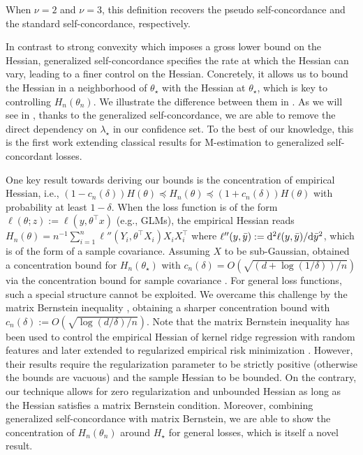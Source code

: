 When $\nu = 2$ and $\nu = 3$, this definition recovers the pseudo self-concordance and the standard self-concordance, respectively.

In contrast to strong convexity which imposes a gross lower bound on the Hessian, generalized self-concordance specifies the rate at which the Hessian can vary, leading to a finer control on the Hessian.
Concretely, it allows us to bound the Hessian in a neighborhood of $\theta_\star$ with the Hessian at $\theta_\star$, which is key to controlling $H_n(\theta_n)$.
We illustrate the difference between them in .
As we will see in , thanks to the generalized self-concordance, we are able to remove the direct dependency on $\lambda_\star$ in our confidence set.
To the best of our knowledge, this is the first work extending classical results for M-estimation to generalized self-concordant losses.

One key result towards deriving our bounds is the concentration of empirical Hessian, i.e., $(1 - c_n(\delta))H(\theta) \preceq H_n(\theta) \preceq (1 + c_n(\delta)) H(\theta)$ with probability at least $1 - \delta$.
When the loss function is of the form $\ell(\theta; z) := \ell(y, \theta^\top x)$ (e.g., GLMs), the empirical Hessian reads $H_n(\theta) = n^{-1} \sum_{i=1}^n \ell''(Y_i, \theta^\top X_i) X_i X_i^\top$ where $\ell''(y, \bar y) := \mathrm{d}^2 \ell(y, \bar y) / \mathrm{d} \bar y^2$, which is of the form of a sample covariance.
Assuming $X$ to be sub-Gaussian, \citet{ostrovskii2021finite} obtained a concentration bound for $H_n(\theta_\star)$ with $c_n(\delta) = O(\sqrt{(d + \log{(1/\delta)})/n})$ via the concentration bound for sample covariance \citep[Thm.~5.39]{vershynin2010introduction}.
For general loss functions, such a special structure cannot be exploited.
We overcame this challenge by the matrix Bernstein inequality \citep[Thm.~6.17]{wainwright2019high}, obtaining a sharper concentration bound with $c_n(\delta) := O(\sqrt{\log{(d/\delta)}/n})$.
Note that the matrix Bernstein inequality has been used to control the empirical Hessian of kernel ridge regression with random features \citep[Prop.~6]{rudi2017generalization} and later extended to regularized empirical risk minimization \citep[Lem.~30]{marteau2019beyond}.
However, their results require the regularization parameter to be strictly positive (otherwise the bounds are vacuous) and the sample Hessian to be bounded.
On the contrary, our technique allows for zero regularization and unbounded Hessian as long as the Hessian satisfies a matrix Bernstein condition.
Moreover, combining generalized self-concordance with matrix Bernstein, we are able to show the concentration of $H_n(\theta_n)$ around $H_\star$ for general losses, which is itself a novel result.

